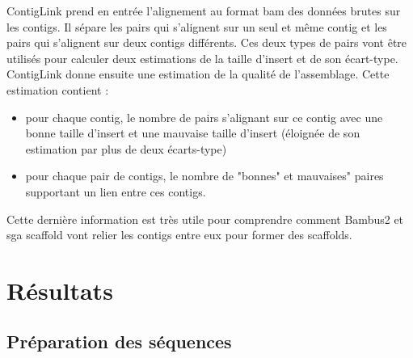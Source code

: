 \documentclass[a4paper]{article}
\begin{document}
ContigLink prend en entrée l'alignement au format bam des données brutes sur les contigs. Il sépare les pairs qui s'alignent sur un seul et même contig et les pairs qui s'alignent sur deux contigs différents. Ces deux types de pairs vont être utilisés pour calculer deux estimations de la taille d'insert et de son écart-type. ContigLink donne ensuite une estimation de la qualité de l'assemblage. Cette estimation contient : 
\begin{itemize}
\item pour chaque contig, le nombre de pairs s'alignant sur ce contig avec une bonne taille d'insert et une mauvaise taille d'insert (éloignée de son estimation par plus de deux écarts-type)
\item pour chaque pair de contigs, le nombre de "bonnes" et mauvaises" paires supportant un lien entre ces contigs.
\end{itemize}

Cette dernière information est très utile pour comprendre comment Bambus2 et sga scaffold vont relier les contigs entre eux pour former des scaffolds. 

\section{Résultats}

\subsection{Préparation des séquences}
\end{document}

